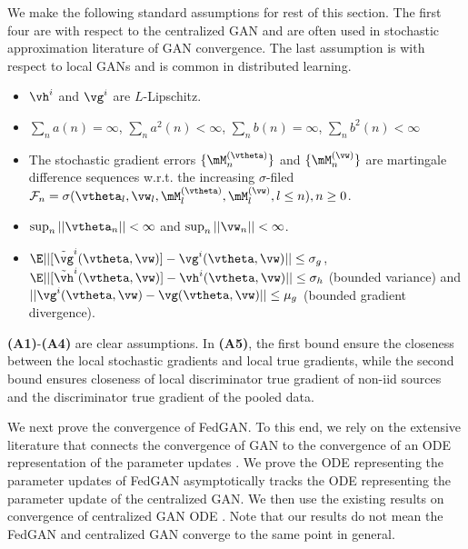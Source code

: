 \documentclass{article}
\begin{document}
	We make the following standard assumptions for rest of this section. The first four are with respect to the centralized GAN and are often used in stochastic approximation literature of GAN convergence. The last assumption is with respect to local GANs and is common in distributed learning.
	 
	\begin{itemize}
		\item [(\textbf{A1})] $\vh^i$  and $\vg^i$ are $L$-Lipschitz.
		\item [(\textbf{A2})] $\sum_n a(n)=\infty$, $\sum_n a^2(n)<\infty$, $\sum_n b(n)=\infty$, $\sum_n b^2(n)<\infty$ 
		\item [(\textbf{A3})] The stochastic gradient errors $\{{\mM}^{(\vtheta)}_{n}\} $ and $\{ {\mM}_{n}^{(\vw)}\}$ are martingale difference sequences w.r.t. the increasing $\sigma$-filed $\mathcal{F}_n=\sigma(\vtheta_l, \vw_l, {\mM}^{(\vtheta)}_{l}, {\mM}_{l}^{(\vw)}, l\leq n),n\geq 0$.  
		\item [(\textbf{A4})] $\sup_n||{\vtheta_n}|| < \infty$ and $\sup_n||{\vw_n}|| < \infty$.
		\item [(\textbf{A5})] $\E||[\tilde{\vg}^i(\vtheta, \vw)]-\vg^i(\vtheta, \vw)||\leq \sigma_g$, $\E||[\tilde{\vh}^i(\vtheta, \vw)]-\vh^i(\vtheta, \vw)||\leq \sigma_h$ (bounded variance) and  $||\vg^i(\vtheta, \vw)-\vg(\vtheta, \vw)||\leq \mu_{g}$ (bounded gradient divergence).
	\end{itemize}
	\textbf{(A1)}-\textbf{(A4)} are clear assumptions. In \textbf{(A5)}, the first bound ensure the closeness between the local stochastic gradients and local true gradients, while the second bound ensures closeness of local discriminator true gradient of non-iid sources and the discriminator true gradient of the pooled data.
	
	We next prove the convergence of FedGAN. To this end, we rely on the  extensive literature that connects the convergence of GAN to the convergence of an ODE representation of the parameter updates \citep{mescheder2017numerics}. We prove the ODE representing the parameter updates of FedGAN asymptotically tracks the ODE representing the parameter update of the centralized GAN. We then use the existing results on convergence of centralized GAN ODE \citep{mescheder2018training, nagarajan2017gradient}. Note that our results do not mean the FedGAN and centralized GAN converge to the same point in general. 
	
\end{document}
